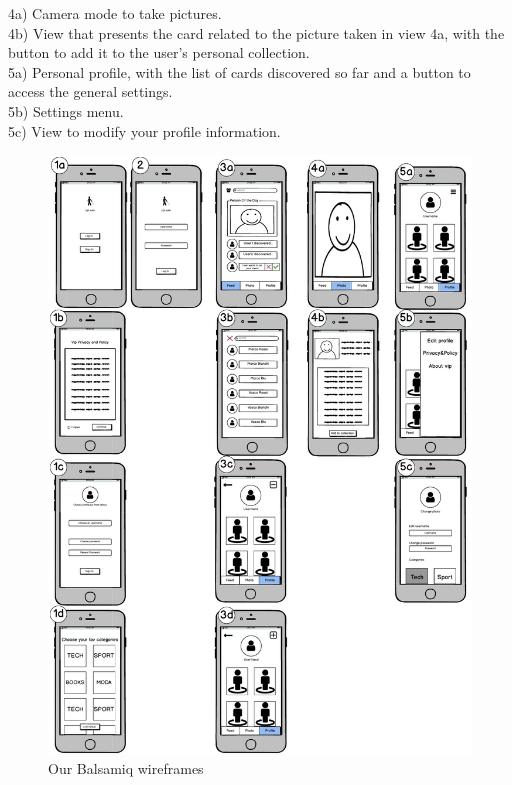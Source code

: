 \documentclass[12pt]{scrartcl}
\begin{document}
	4a) Camera mode to take pictures.\\
	4b) View that presents the card related to the picture taken in view 4a, with the button to add it to the user's personal collection.\\

	5a) Personal profile, with the list of cards discovered so far and a button to access the general settings.\\
	5b) Settings menu.\\
	5c) View to modify your profile information.\\
	
	\begin{figure}[H]
        		\centering
       		\includegraphics[width=\textwidth]{wireframes.pdf}
       		\caption{Our Balsamiq wireframes}
        		\label{wireframes}
	\end{figure}
	
\end{document}
